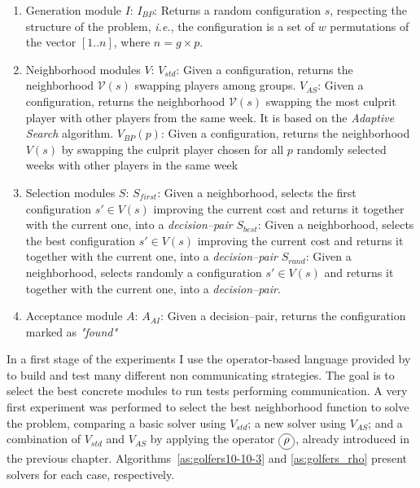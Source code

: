 \begin{enumerate}
	\item Generation module $I$:
	\subitem $I_{BP}$: Returns a random configuration $s$, respecting the structure of the problem, {\it i.e.}, the configuration is a set of $w$ permutations of the vector $[1..n]$, where $n=g\times p$.
	\item Neighborhood modules $V$:
	\subitem $V_{std}$: Given a configuration, returns the neighborhood $\mathcal{V}\left(s\right)$ swapping players among groups.
	\subitem $V_{AS}$: Given a configuration, returns the neighborhood $\mathcal{V}\left(s\right)$ swapping the most culprit player with other players from the same week. It is based on the {\it Adaptive Search} algorithm.
	\subitem $V_{BP}(p)$: Given a configuration, returns the neighborhood $V\left(s\right)$ by swapping the culprit player chosen for all $p$ randomly selected weeks with other players in the same week
	\item Selection modules $S$:
	\subitem $S_{first}$: Given a neighborhood, selects the first configuration $s' \in V\left(s\right)$ improving the current cost and returns it together with the current one, into a \textit{decision--pair}
	\subitem $S_{best}$: Given a neighborhood, selects the best configuration $s' \in V\left(s\right)$ improving the current cost and returns it together with the current one, into a \textit{decision--pair}
	\subitem $S_{rand}$: Given a neighborhood, selects randomly a configuration $s' \in V\left(s\right)$ and returns it together with the current one, into a \textit{decision--pair}.
	\item Acceptance module $A$:
	\subitem $A_{AI}$: Given a decision--pair, returns the configuration marked as \textit{"found"}
\end{enumerate}

In a first stage of the experiments I use the operator-based language provided by \posl{} to build and test many different non communicating strategies. The goal is to select the best concrete modules to run tests performing communication. A very first experiment was performed to select the best neighborhood function to solve the problem, comparing a basic solver using $V_{std}$; a new solver using $V_{AS}$; and a combination of $V_{std}$ and $V_{AS}$ by applying the operator $\circled{$\rho$}$, already introduced in the previous chapter. Algorithms~\ref{as:golfers10-10-3} and \ref{as:golfers_rho} present solvers for each case, respectively.

